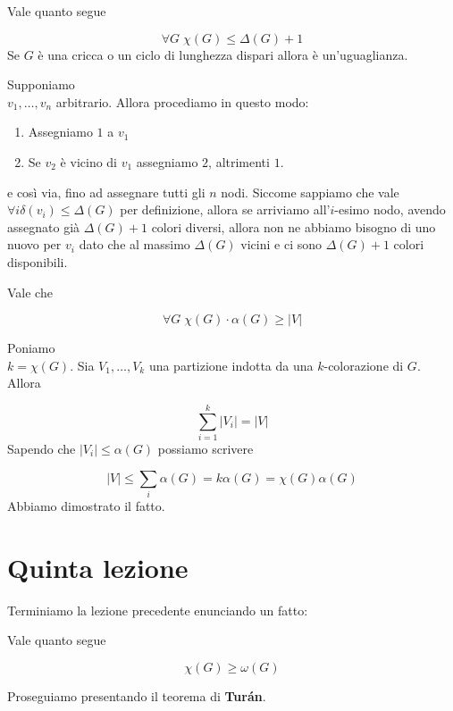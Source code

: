 \documentclass[12pt]{report}
\begin{document}
\begin{fatto} Vale quanto segue 

$$\forall G \; \chi(G) \leq \Delta(G) + 1$$
Se $G$ è una cricca o un ciclo di lunghezza dispari allora è un'uguaglianza.
\end{fatto}

\begin{dimo}
    Supponiamo \\ $v_1,\dots,v_n$ arbitrario. Allora procediamo in questo modo:

    \begin{enumerate}
        \item Assegniamo $1$ a $v_1$
        \item Se $v_2$ è vicino di $v_1$ assegniamo $2$, altrimenti $1$.
    \end{enumerate}
    e così via, fino ad assegnare tutti gli $n$ nodi. Siccome sappiamo che vale $\forall i \delta(v_i) \leq \Delta(G)$ per definizione, allora se arriviamo all'$i$-esimo nodo, avendo assegnato già $\Delta(G) + 1$ colori diversi, allora non ne abbiamo bisogno di uno nuovo per $v_i$ dato che al massimo $\Delta(G)$ vicini e ci sono $\Delta(G) + 1$ colori disponibili.
\end{dimo}

\begin{fatto}
    Vale che 

    $$\forall G  \; \chi(G) \cdot \alpha(G) \geq |V|$$
\end{fatto}

\begin{dimo}
    Poniamo \\ $k = \chi(G)$. Sia $V_1,\dots,V_k$ una partizione indotta da una $k$-colorazione di $G$. Allora

    $$\sum_{i = 1}^k |V_i|  = |V|$$
    Sapendo che $|V_i| \leq \alpha(G)$ possiamo scrivere

    $$|V| \leq \sum_i \alpha(G)  = k \alpha(G) = \chi(G) \alpha(G)$$ Abbiamo dimostrato il fatto.
\end{dimo}


\chapter{Quinta lezione}

\noindent
Terminiamo la lezione precedente enunciando un fatto:

\begin{fatto}
    Vale quanto segue 

    $$\chi(G) \geq \omega(G)$$
\end{fatto}
Proseguiamo presentando il teorema di \textbf{Turán}.
\end{document}
